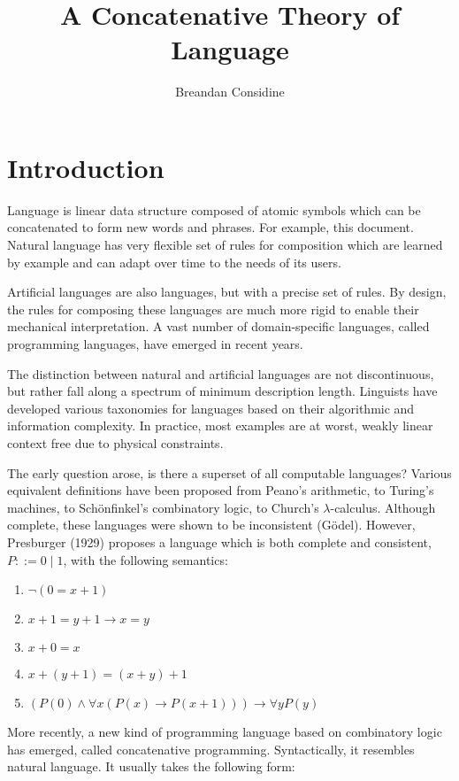 \documentclass[11pt]{article}
\title{A Concatenative Theory of Language}
\author{Breandan Considine}
\begin{document}
\maketitle
\section{Introduction}

Language is linear data structure composed of atomic symbols which can be concatenated to form new words and phrases. For example, this document. Natural language has very flexible set of rules for composition which are learned by example and can adapt over time to the needs of its users.

Artificial languages are also languages, but with a precise set of rules. By design, the rules for composing these languages are much more rigid to enable their mechanical interpretation. A vast number of domain-specific languages, called programming languages, have emerged in recent years.

The distinction between natural and artificial languages are not discontinuous, but rather fall along a spectrum of minimum description length. Linguists have developed various taxonomies for languages based on their algorithmic and information complexity. In practice, most examples are at worst, weakly linear context free due to physical constraints.

The early question arose, is there a superset of all computable languages? Various equivalent definitions have been proposed from Peano's arithmetic, to Turing's machines, to Sch\"onfinkel's combinatory logic, to Church's $λ$-calculus. Although complete, these languages were shown to be inconsistent (G\"odel). However, Presburger (1929) proposes a language which is both complete and consistent, $P ::= 0 \mid 1$, with the following semantics:

\begin{enumerate}
   \item $¬(0 = x + 1)                 $
   \item $x + 1 = y + 1 → x = y        $
   \item $x + 0 = x                    $
   \item $x + (y + 1) = (x + y) + 1    $
   \item $(P(0) ∧ ∀x(P(x) → P(x + 1))) → ∀y P(y)$
\end{enumerate}

More recently, a new kind of programming language based on combinatory logic has emerged, called concatenative programming. Syntactically, it resembles natural language. It usually takes the following form:
\end{document}
